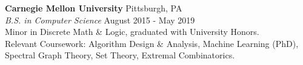 \documentclass[margin, 10pt]{res-short} %
\begin{document}
\begin{resume}
{\bf Carnegie Mellon University} \hfill Pittsburgh, PA \\
\emph{B.S. in Computer Science} \hfill August 2015 - May 2019 \\
Minor in Discrete Math \& Logic, graduated with University Honors. \\
Relevant Coursework: Algorithm Design \& Analysis, Machine Learning (PhD), Spectral Graph Theory, Set Theory, Extremal Combinatorics.









\end{resume}
\end{document}
